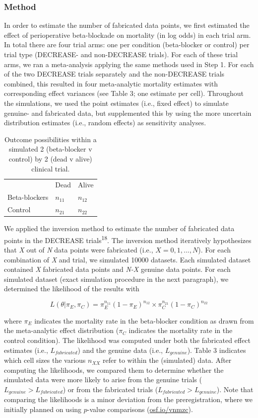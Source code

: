 \documentclass[]{article}
\begin{document}
\subsubsection{Method}\label{method-1}

In order to estimate the number of fabricated data points, we first
estimated the effect of perioperative beta-blockade on mortality (in log
odds) in each trial arm. In total there are four trial arms: one per
condition (beta-blocker or control) per trial type (DECREASE- and
non-DECREASE trials). For each of these trial arms, we ran a
meta-analysis applying the same methods used in Step 1. For each of the
two DECREASE trials separately and the non-DECREASE trials combined,
this resulted in four meta-analytic mortality estimates with
corresponding effect variances (see Table 3; one estimate per cell).
Throughout the simulations, we used the point estimates (i.e., fixed
effect) to simulate genuine- and fabricated data, but supplemented this
by using the more uncertain distribution estimates (i.e., random
effects) as sensitivity analyses.

\begin{longtable}[]{@{}lll@{}}
\caption{Outcome possibilities within a simulated 2 (beta-blocker v
control) by 2 (dead v alive) clinical trial.}\tabularnewline
\toprule
& Dead & Alive\tabularnewline
Beta-blockers & \(n_{11}\) & \(n_{12}\)\tabularnewline
Control & \(n_{21}\) & \(n_{22}\)\tabularnewline
\bottomrule
\end{longtable}

We applied the inversion method to estimate the number of fabricated
data points in the DECREASE trials\textsuperscript{18}. The inversion
method iteratively hypothesizes that \emph{X} out of \emph{N} data
points were fabricated (i.e., \(X={0, 1, ..., N}\)). For each
combination of \emph{X} and trial, we simulated 10000 datasets. Each
simulated dataset contained \emph{X} fabricated data points and
\emph{N-X} genuine data points. For each simulated dataset (exact
simulation procedure in the next paragraph), we determined the
likelihood of the results with

\begin{equation}
\label{eq1}
L(\theta|\pi_{E},\pi_{C})=\pi_{E}^{n_{11}}(1-\pi_{E})^{n_{12}} \times \pi_{C}^{n_{21}}(1 - \pi_{C})^{n_{22}}
\end{equation}

where \(\pi_{E}\) indicates the mortality rate in the beta-blocker
condition as drawn from the meta-analytic effect distribution
(\(\pi_{C}\) indicates the mortality rate in the control condition). The
likelihood was computed under both the fabricated effect estimates
(i.e., \(L_{fabricated}\)) and the genuine data (i.e., \(L_{genuine}\)).
Table 3 indicates which cell sizes the various \(n_{XX}\) refer to
within the (simulated) data. After computing the likelihoods, we
compared them to determine whether the simulated data were more likely
to arise from the genuine trials (\(L_{genuine}>L_{fabricated}\)) or
from the fabricated trials (\(L_{fabricated}>L_{genuine}\)). Note that
comparing the likelihoods is a minor deviation from the preregistration,
where we initially planned on using \(p\)-value comparisons
(\href{https://osf.io/vnmzc}{osf.io/vnmzc}).
\end{document}
